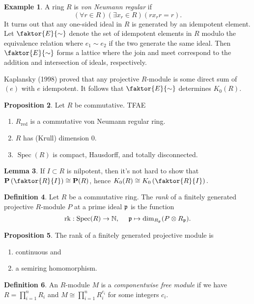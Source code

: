 \documentclass[10pt,letterpaper,cm]{nupset}
\theoremstyle{definition}
\newtheorem{definition}{Definition}[section]
\newtheorem{exmp}[definition]{Example}
\theoremstyle{theorem}
\newtheorem{lemma}[definition]{Lemma}
\newtheorem{prop}[definition]{Proposition}
\theoremstyle{remark}
\newcommand{\N}{\mathbb N}
\renewcommand{\P}{\mathbf P}
\newcommand{\1}{\mathbf{1}}
\newcommand{\0}{\vec 0}
\DeclareMathOperator{\red}{red}
\DeclareMathOperator{\spec}{Spec}
\DeclareMathOperator{\rk}{rk}
\begin{document}
\begin{exmp}
A ring $R$ is \textit{von Neumann regular} if $$(\forall r \in R)(\exists x_r\in R)(rx_rr=r).$$ It turns out that any one-sided ideal in $R$ is generated by an idempotent element. Let $\faktor{E}{\sim}$ denote the set of idempotent elements in $R$ modulo the equivalence relation where $e_1 \sim e_2$ if the two generate the same ideal. Then  $\faktor{E}{\sim}$  forms a lattice where the join and meet correspond to the addition and intersection of ideals, respectively.

\smallskip

 Kaplansky (1998) proved that any projective $R$-module is some direct sum of $(e)$ with $e$ idempotent. It follows that $\faktor{E}{\sim}$ determines $K_0(R)$.
\end{exmp}

\begin{prop}\label{Krull}
Let $R$ be commutative. TFAE
\begin{enumerate}
\item $R_{\red}$ is a commutative von Neumann regular ring.
\item $R$ has (Krull) dimension $0$.
\item $\spec(R)$ is compact, Hausdorff, and totally disconnected.
\end{enumerate}
\end{prop}

\begin{lemma}\label{L5}
If $I\subset R$ is nilpotent, then it's not hard to show that $\P\left(\faktor{R}{I}\right) \cong \P(R)$, hence $K_0(R) \cong K_0\left(\faktor{R}{I}\right).$
\end{lemma}

\begin{definition}
Let $R$ be a commutative ring. The \textit{rank} of a finitely generated projective $R$-module $P$ at a prime ideal $\frak{p}$ is the function $$\rk: \spec(R) \to \N,\  \quad \frak{p} \mapsto \dim_{R_{\frak{p}}} (P \otimes R_{\frak{p}}).$$
\end{definition}
\begin{prop} The rank of a finitely generated projective module is
\begin{enumerate}
\item continuous and
\item a semiring homomorphism.
\end{enumerate}
\end{prop}

\begin{definition}
An $R$-module $M$ is a \textit{componentwise free module} if we have $R = \prod_{i=1}^n R_i$ and $M \cong \prod_{i=1}^n R_i^{c_i}$ for some integers $c_i$.
\end{definition}
\end{document}
